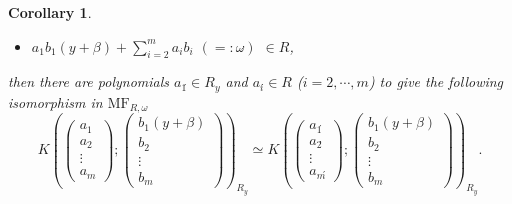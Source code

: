 \documentclass[10pt]{amsart}
\theoremstyle{break}
\newtheorem{cor}[de]{Corollary}
\begin{document}
\begin{cor}
\begin{itemize}
\item[(ii)] $\displaystyle a_1b_1(y+\beta)+\sum_{i=2}^m a_ib_i$ $(=:\omega\acute{})$ $\in R$,
\end{itemize}
then there are polynomials $a_1\acute{} \in R_y$ and $a_i\acute{} \in R$ ($i=2,\cdots ,m$) to give the following isomorphism in ${{\mathrm{MF}}}_{R,\omega\acute{}}$
\begin{equation*}
K\left(\left(
\begin{array}{c}
a_1\\
a_2\\
\vdots\\
a_m
\end{array}
\right);
\left(
\begin{array}{c}
b_1(y+\beta)\\
b_2\\
\vdots\\
b_m
\end{array}
\right)\right)_{R_y}
\simeq
K\left(\left(
\begin{array}{c}
a_1\acute{}\\
a_2\acute{}\\
\vdots\\
a_m\acute{}
\end{array}
\right);
\left(
\begin{array}{c}
b_1(y+\beta)\\
b_2\\
\vdots\\
b_m
\end{array}
\right)\right)_{R_y}.
\end{equation*}
\end{cor}
\end{document}
